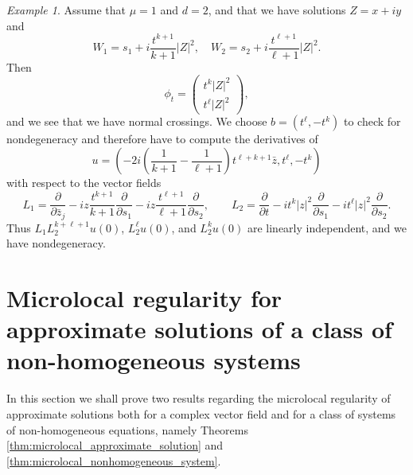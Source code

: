 \documentclass[11pt]{amsart}
\newcommand{\dop}[1]{\frac{\partial}{\partial #1}}
\theoremstyle{definition}
\theoremstyle{remark}
\newtheorem{exa}[defn]{Example}
\theoremstyle{plain}
\begin{document}
\begin{exa}
  Assume that $\mu=1$ and $d=2$, and that we have solutions  $Z = x+ iy$ and 
  \[ W_1 = s_1 + i \frac{t^{k+1}}{k+1} |Z|^2 , \quad W_2 = s_2 + i\frac{ t^{\ell+1}}{\ell+1} |Z|^2.  \]
  Then
  \[ \phi_t =
    \begin{pmatrix}
     t^k |Z|^2 \\
      t^\ell |Z|^2
    \end{pmatrix}, \]
  and we see that we have normal crossings.
  We choose $b=(t^\ell, -t^k)$ to check for nondegeneracy and therefore
  have to compute the derivatives of 
  \[ u =  \left(-2i\left(\frac{1}{k+1} - \frac{1}{\ell+1}\right) t^{\ell + k + 1} \bar z, t^{\ell}
      , -t^k\right) \]
  with respect to the vector fields
  \[ L_1 = \dop{\bar z_j} - i z\frac{t^{k+1}}{k+1}   \dop{s_1} -  i z \frac{ t^{\ell+1}}{\ell+1} \dop{s_2}, \qquad L_2 =
    \dop{t} -  i t^k |z|^2 \dop{s_1} -  it^\ell |z|^2 \dop{s_2}.  \] 
  Thus $L_1 L_2^{k+\ell +1} u (0) $, $L_2^\ell u (0)$, and $L_2^k u (0)$ are linearly independent, and
  we have nondegeneracy. 
\end{exa}



%
\section{Microlocal regularity for approximate solutions of a class of non-homogeneous systems}
%
%
In this section we shall prove two results regarding the microlocal regularity of approximate solutions both for a complex vector field and for a class of systems of non-homogeneous equations, namely Theorems \ref{thm:microlocal_approximate_solution} and \ref{thm:microlocal_nonhomogeneous_system}.
\end{document}
